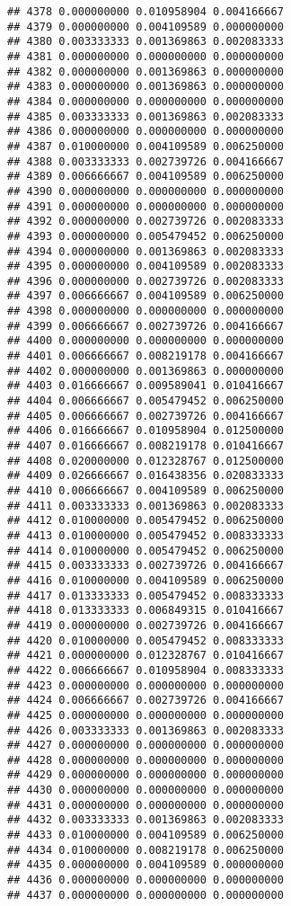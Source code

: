 \documentclass[
]{article}
\begin{document}
\begin{verbatim}
## 4378 0.000000000 0.010958904 0.004166667
## 4379 0.000000000 0.004109589 0.000000000
## 4380 0.003333333 0.001369863 0.002083333
## 4381 0.000000000 0.000000000 0.000000000
## 4382 0.000000000 0.001369863 0.000000000
## 4383 0.000000000 0.001369863 0.000000000
## 4384 0.000000000 0.000000000 0.000000000
## 4385 0.003333333 0.001369863 0.002083333
## 4386 0.000000000 0.000000000 0.000000000
## 4387 0.010000000 0.004109589 0.006250000
## 4388 0.003333333 0.002739726 0.004166667
## 4389 0.006666667 0.004109589 0.006250000
## 4390 0.000000000 0.000000000 0.000000000
## 4391 0.000000000 0.000000000 0.000000000
## 4392 0.000000000 0.002739726 0.002083333
## 4393 0.000000000 0.005479452 0.006250000
## 4394 0.000000000 0.001369863 0.002083333
## 4395 0.000000000 0.004109589 0.002083333
## 4396 0.000000000 0.002739726 0.002083333
## 4397 0.006666667 0.004109589 0.006250000
## 4398 0.000000000 0.000000000 0.000000000
## 4399 0.006666667 0.002739726 0.004166667
## 4400 0.000000000 0.000000000 0.000000000
## 4401 0.006666667 0.008219178 0.004166667
## 4402 0.000000000 0.001369863 0.000000000
## 4403 0.016666667 0.009589041 0.010416667
## 4404 0.006666667 0.005479452 0.006250000
## 4405 0.006666667 0.002739726 0.004166667
## 4406 0.016666667 0.010958904 0.012500000
## 4407 0.016666667 0.008219178 0.010416667
## 4408 0.020000000 0.012328767 0.012500000
## 4409 0.026666667 0.016438356 0.020833333
## 4410 0.006666667 0.004109589 0.006250000
## 4411 0.003333333 0.001369863 0.002083333
## 4412 0.010000000 0.005479452 0.006250000
## 4413 0.010000000 0.005479452 0.008333333
## 4414 0.010000000 0.005479452 0.006250000
## 4415 0.003333333 0.002739726 0.004166667
## 4416 0.010000000 0.004109589 0.006250000
## 4417 0.013333333 0.005479452 0.008333333
## 4418 0.013333333 0.006849315 0.010416667
## 4419 0.000000000 0.002739726 0.004166667
## 4420 0.010000000 0.005479452 0.008333333
## 4421 0.000000000 0.012328767 0.010416667
## 4422 0.006666667 0.010958904 0.008333333
## 4423 0.000000000 0.000000000 0.000000000
## 4424 0.006666667 0.002739726 0.004166667
## 4425 0.000000000 0.000000000 0.000000000
## 4426 0.003333333 0.001369863 0.002083333
## 4427 0.000000000 0.000000000 0.000000000
## 4428 0.000000000 0.000000000 0.000000000
## 4429 0.000000000 0.000000000 0.000000000
## 4430 0.000000000 0.000000000 0.000000000
## 4431 0.000000000 0.000000000 0.000000000
## 4432 0.003333333 0.001369863 0.002083333
## 4433 0.010000000 0.004109589 0.006250000
## 4434 0.010000000 0.008219178 0.006250000
## 4435 0.000000000 0.004109589 0.000000000
## 4436 0.000000000 0.000000000 0.000000000
## 4437 0.000000000 0.000000000 0.000000000

\end{verbatim}
\end{document}
